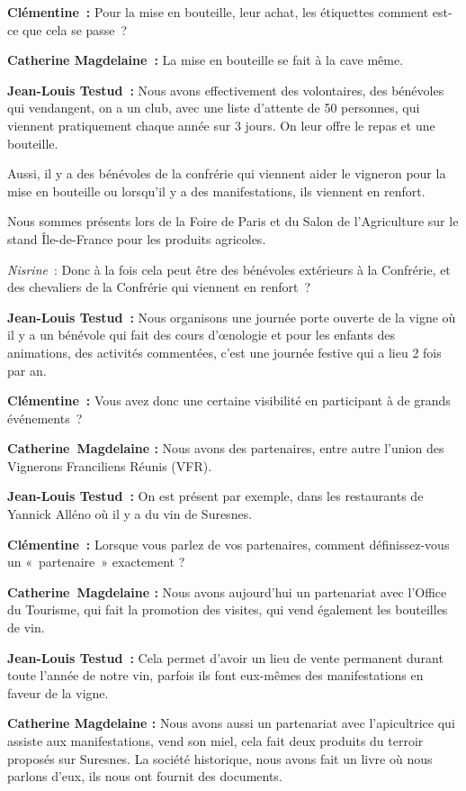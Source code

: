 \documentclass[a4paper, titlepage]{report}
\begin{document}
\textbf{Clémentine~:} Pour la mise en bouteille, leur achat, les
étiquettes comment est-ce que cela se passe~?

\textbf{Catherine Magdelaine~:} La mise en bouteille se fait à la cave
même.

\textbf{Jean-Louis Testud~:} Nous avons effectivement des volontaires,
des bénévoles qui vendangent, on a un club, avec une liste d'attente de
50 personnes, qui viennent pratiquement chaque année sur 3 jours. On
leur offre le repas et une bouteille.

Aussi, il y a des bénévoles de la confrérie qui viennent aider le
vigneron pour la mise en bouteille ou lorsqu'il y a des manifestations,
ils viennent en renfort.

Nous sommes présents lors de la Foire de Paris et du Salon de
l'Agriculture sur le stand Île-de-France pour les produits agricoles.

\emph{Nisrine}~: Donc à la fois cela peut être des bénévoles extérieurs
à la Confrérie, et des chevaliers de la Confrérie qui viennent en
renfort~?

\textbf{Jean-Louis Testud~:} Nous organisons une journée porte ouverte
de la vigne où il y a un bénévole qui fait des cours d'œnologie et pour
les enfants des animations, des activités commentées, c'est une journée
festive qui a lieu 2 fois par an.

\textbf{Clémentine~:} Vous avez donc une certaine visibilité en
participant à de grands événements~?

\textbf{Catherine~Magdelaine :} Nous avons des partenaires, entre autre
l'union des Vignerons Franciliens Réunis (VFR).

\textbf{Jean-Louis Testud~:} On est présent par exemple, dans les
restaurants de Yannick Alléno où il y a du vin de Suresnes.

\textbf{Clémentine~:} Lorsque vous parlez de vos partenaires, comment
définissez-vous un «~partenaire~» exactement ?

\textbf{Catherine~Magdelaine :} Nous avons aujourd'hui un partenariat
avec l'Office du Tourisme, qui fait la promotion des visites, qui vend
également les bouteilles de vin.

\textbf{Jean-Louis Testud~:} Cela permet d'avoir un lieu de vente
permanent durant toute l'année de notre vin, parfois ils font eux-mêmes
des manifestations en faveur de la vigne.

\textbf{Catherine Magdelaine :} Nous avons aussi un partenariat avec
l'apicultrice qui assiste aux manifestations, vend son miel, cela fait
deux produits du terroir proposés sur Suresnes. La société historique,
nous avons fait un livre où nous parlons d'eux, ils nous ont fournit des
documents.
\end{document}
